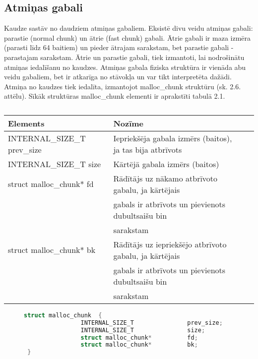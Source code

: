 \subsection{Atmiņas gabali}
\label{subsec:atminas_gabali}

Kaudze sastāv no daudziem atmiņas gabaliem.
Eksistē divu veidu atmiņas gabali: parastie (normal chunk) un ātrie (fast chunk) gabali. 
Ātrie gabali ir maza izmēra (parasti līdz 64 baitiem) un pieder ātrajam sarakstam, bet parastie gabali - parastajam sarakstam. 
Ātrie un parastie gabali, tiek izmantoti, lai nodrošinātu atmiņas iedalīšanu no kaudzes.
Atmiņas gabala fiziska struktūra ir vienāda abu veidu gabaliem, bet ir atkarīga no stāvokļa un var tikt interpretēta dažādi.
Atmiņa no kaudzes tiek iedalīta, izmantojot malloc\_chunk struktūru (sk. 2.6. attēlu). 
Sīkāk struktūras malloc\_chunk elementi ir aprakstīti tabulā 2.1.

\begin{table}[H]
\caption{\textbf{\fontsize{11}{12}\selectfont {\\ Atmiņas gabalu struktūras elementu apraksts}}} 
\label{table:kysymys}
\centering
	\begin{tabular}{|l|l|r|p{5cm}|}
	  \hline
	Elements & Nozīme \\
	\hline
	  INTERNAL\_SIZE\_T               prev\_size & Iepriekšēja gabala izmērs (baitos), ja tas bija atbrīvots\\
      \hline
      INTERNAL\_SIZE\_T               size & Kārtējā gabala izmērs (baitos) \\
      \hline
      struct malloc\_chunk*          fd & Rādītājs uz nākamo atbrīvoto gabalu, ja kārtējais  \\
                                                     & gabals ir atbrīvots un pievienots dubultsaišu bin \\
                                                     & sarakstam\\
      \hline
      struct malloc\_chunk*          bk & Rādītājs uz iepriekšējo atbrīvoto gabalu, ja kārtējais  \\
                                                     & gabals ir atbrīvots un pievienots dubultsaišu bin \\
                                                     & sarakstam\\
    \hline
	\end{tabular}
\end{table}
\begin{figure}[h]
\begin{lstlisting}[language=C++]
struct malloc_chunk  {
                INTERNAL_SIZE_T               prev_size;
                INTERNAL_SIZE_T               size;
                struct malloc_chunk*          fd;
                struct malloc_chunk*          bk;
 }
\end{lstlisting}
\caption{\textbf{\fontsize{11}{12}\selectfont {Atmiņas gabala struktūra}}}
\end{figure}

